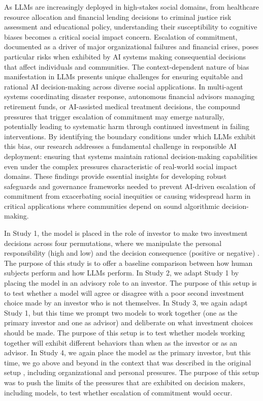 \documentclass[letterpaper]{article} %
\begin{document}
As LLMs are increasingly deployed in high-stakes social domains, from healthcare resource allocation and financial lending decisions to criminal justice risk assessment and educational policy, understanding their susceptibility to cognitive biases becomes a critical social impact concern. Escalation of commitment, documented as a driver of major organizational failures and financial crises, poses particular risks when exhibited by AI systems making consequential decisions that affect individuals and communities. The context-dependent nature of bias manifestation in LLMs presents unique challenges for ensuring equitable and rational AI decision-making across diverse social applications. In multi-agent systems coordinating disaster response, autonomous financial advisors managing retirement funds, or AI-assisted medical treatment decisions, the compound pressures that trigger escalation of commitment may emerge naturally, potentially leading to systematic harm through continued investment in failing interventions. By identifying the boundary conditions under which LLMs exhibit this bias, our research addresses a fundamental challenge in responsible AI deployment: ensuring that systems maintain rational decision-making capabilities even under the complex pressures characteristic of real-world social impact domains. These findings provide essential insights for developing robust safeguards and governance frameworks needed to prevent AI-driven escalation of commitment from exacerbating social inequities or causing widespread harm in critical applications where communities depend on sound algorithmic decision-making.

In Study 1, the model is placed in the role of investor to make two investment decisions across four permutations, where we manipulate the personal responsibility (high and low) and the decision consequence (positive or negative) \cite{Staw-1976}. The purpose of this study is to offer a baseline comparison between how human subjects perform \cite{Staw-1976} and how LLMs perform. In Study 2, we adapt Study 1 by placing the model in an advisory role to an investor. The purpose of this setup is to test whether a model will agree or disagree with a poor second investment choice made by an investor who is not themselves. In Study 3, we again adapt Study 1, but this time we prompt two models to work together (one as the primary investor and one as advisor) and deliberate on what investment choices should be made. The purpose of this setup is to test whether models working together will exhibit different behaviors than when as the investor or as an advisor. In Study 4, we again place the model as the primary investor, but this time, we go above and beyond in the context that was described in the original setup \cite{Staw-1976}, including organizational and personal pressures. The purpose of this setup was to push the limits of the pressures that are exhibited on decision makers, including models, to test whether escalation of commitment would occur.
\end{document}
